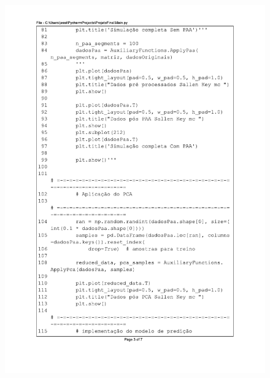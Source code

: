 \begin{figure}[H]
\centering
\includegraphics[scale=0.9]{01_Pre_textuais/code/main3.pdf}
\end{figure}
